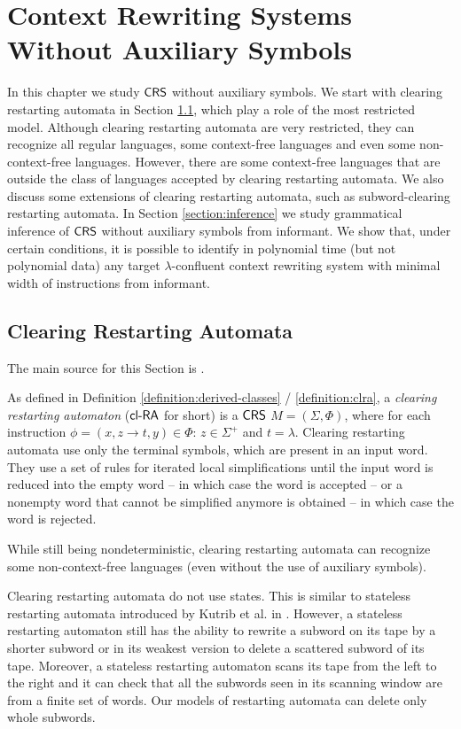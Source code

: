 \chapter{Context Rewriting Systems Without Auxiliary Symbols}

In this chapter we study $\mbox{\sf CRS\/}$ without auxiliary symbols. We start with clearing restarting automata in Section \ref{section:clra}, which play a role of the most restricted model. Although clearing restarting automata are very restricted, they can recognize all regular languages, some context-free languages and even some non-context-free languages. However, there are some context-free languages that are outside the class of languages accepted by clearing restarting automata. We also discuss some extensions of clearing restarting automata, such as subword-clearing restarting automata. In Section \ref{section:inference} we study grammatical inference of $\mbox{\sf CRS\/}$ without auxiliary symbols from informant. We show that, under certain conditions, it is possible to identify in polynomial time (but not polynomial data) any target $\lambda$-confluent context rewriting system with minimal width of instructions from informant.

\section{Clearing Restarting Automata}\label{section:clra}

The main source for this Section is \cite{C10Diploma, CM10}.

As defined in Definition \ref{definition:derived-classes} / \ref{definition:clra}, a \emph{clearing restarting automaton} \cite{CM10} (\emph{$\mbox{\sf cl-RA\/}$} for short) is a $\mbox{\sf CRS\/}$ $M = (\Sigma, \Phi)$, where for each instruction $\phi = (x, z \to t, y) \in \Phi$: $z \in \Sigma^+$ and $t = \lambda$. Clearing restarting automata use only the terminal symbols, which are present in an input word. They use a set of rules for iterated local simplifications until the input word is reduced into the empty word -- in which case the word is accepted -- or a nonempty word that cannot be simplified anymore is obtained -- in which case the word is rejected.

While still being nondeterministic, clearing restarting automata can recognize some non-context-free languages (even without the use of auxiliary symbols).

Clearing restarting automata do not use states. This is similar to stateless restarting automata introduced by Kutrib et al. in \cite{KuMeOt08}. However, a stateless restarting automaton still has the ability to rewrite a subword on its tape by a shorter subword or in its weakest version to delete a scattered subword of its tape. Moreover, a stateless restarting automaton scans its tape from the left to the right and it can check that all the subwords seen in its scanning window are from a finite set of words. Our models of restarting automata can delete only whole subwords.

